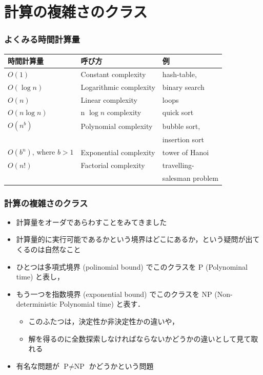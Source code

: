 \section{計算の複雑さのクラス}
\begin{frame}
\frametitle{よくみる時間計算量}
  \begin{tabular}{l|l|l}
時間計算量 & 呼び方 & 例\\
\hline
\(O(1)\)& Constant complexity & hash-table,\\
\(O(\log{}n)\)& Logarithmic complexity & binary search \\
\(O(n)\)& Linear complexity & loops \\
\(O(n\log{}n)\)& n \(\log{}n\) complexity & quick sort\\
\(O(n^b)\)& Polynomial complexity & bubble sort,\\&& insertion sort\\
\(O(b^n)\), {\scriptsize where \(b>1\)}& Exponential complexity & {\scriptsize tower of Hanoi}\\
\(O(n!)\) & Factorial complexity & {\scriptsize travelling-}\\&&{\scriptsize salesman problem}\\
  \end{tabular}
\end{frame}
\begin{frame}[shrink]
\frametitle{計算の複雑さのクラス}
  \begin{itemize}
\item 計算量をオーダであらわすことをみてきました
\item 計算量的に実行可能であるかという境界はどこにあるか，という疑問が出てくるのは自然なこと
\item ひとつは多項式境界 (polinomial bound) でこのクラスを P (Polynominal time) と表し，
\item もう一つを指数境界 (exponential bound) でこのクラスを NP (Non-deterministic Polynomial time) と表す．
    \begin{itemize}
\item このふたつは，決定性か非決定性かの違いや，
\item 解を得るのに全数探索しなければならないかどうかの違いとして見て取れる
    \end{itemize}
\item 有名な問題が \(\mbox{P}\neq\mbox{NP}\) かどうかという問題
  \end{itemize}
\end{frame}
